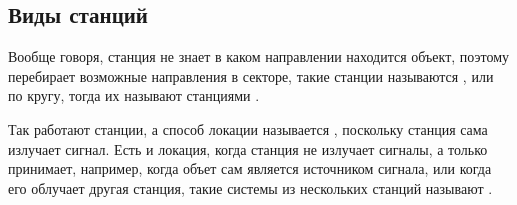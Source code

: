 \subsection{Виды станций}

Вообще говоря, станция не знает в каком направлении находится объект, поэтому перебирает возможные направления в секторе,
такие станции называются , или по кругу, тогда их называют станциями .

Так работают  станции, а способ локации называется , поскольку станция сама излучает сигнал. Есть
и  локация, когда станция не излучает сигналы, а только принимает, например, когда объет сам является источником сигнала,
или когда его облучает другая станция, такие системы из нескольких станций называют .
